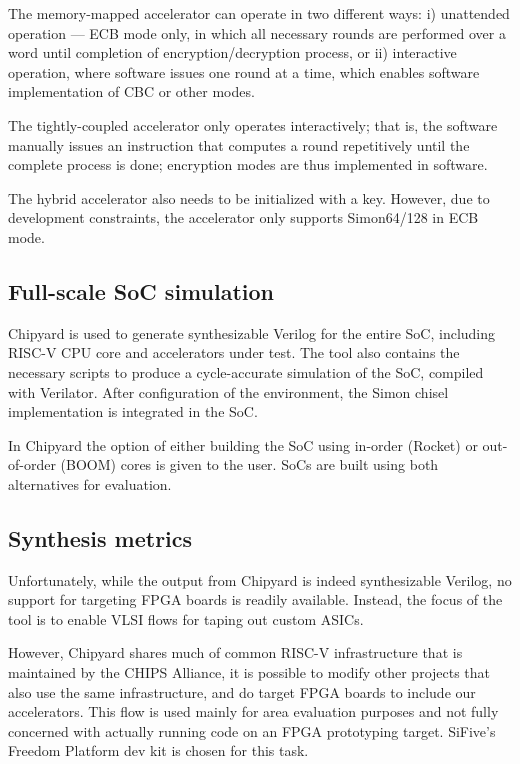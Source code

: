 \documentclass[10pt,conference]{IEEEtran}
\begin{document}
The memory-mapped accelerator can operate in two different ways: i) unattended
operation --- ECB mode only, in which all necessary rounds are performed over a word until
completion of encryption/decryption process, or ii) interactive operation, where
software issues one round at a time, which enables software implementation of
CBC or other modes.

The tightly-coupled accelerator only operates interactively; that is, the
software manually issues an instruction that computes a round repetitively
until the complete process is done; encryption modes are thus
implemented in software.

The hybrid accelerator also needs to be initialized with a key. However, due to
development constraints, the accelerator only supports Simon64/128 in ECB mode.


\subsection{Full-scale SoC simulation}

Chipyard is used to generate synthesizable Verilog for the
entire SoC, including RISC-V CPU core and accelerators under test. The tool also
contains the necessary scripts to produce a cycle-accurate simulation of the
SoC, compiled with Verilator. After configuration of the environment, the Simon
chisel implementation is integrated in the SoC.

In Chipyard the option of either building the SoC using in-order (Rocket) or
out-of-order (BOOM) cores is given to the user. SoCs are built using both
alternatives for evaluation.

\subsection{Synthesis metrics}

Unfortunately, while the output from Chipyard is indeed synthesizable Verilog,
no support for targeting FPGA boards is readily available. Instead, the focus of
the tool is to enable VLSI flows for taping out custom ASICs.

However, Chipyard shares much of common RISC-V infrastructure that is maintained
by the CHIPS Alliance, it is possible to modify other projects that also use the
same infrastructure, and do target FPGA boards to include our accelerators. This
flow is used mainly for area evaluation purposes and not fully concerned with
actually running code on an FPGA prototyping target. SiFive's Freedom Platform
dev kit is chosen for this task.
\end{document}
